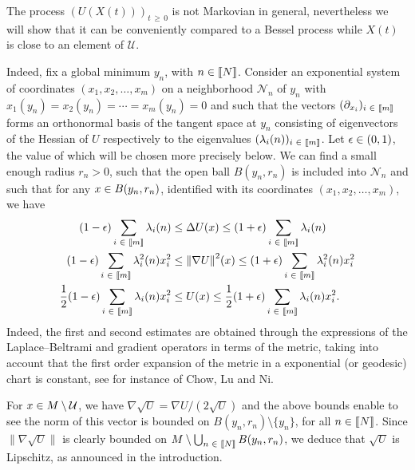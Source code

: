 \documentclass[AHL,Unicode,longabstracts,published]{cedram}
\newcommand{\f}[2]{\frac{#1}{#2}}
\newcommand{\cN}{\mathcal{N}}
\newcommand{\cU}{\mathcal{U}}
\newcommand{\na}{\nabla}
\newcommand{\pa}{\partial}
\newcommand{\tr}{\Delta}
\let\originalleft\left
\let\originalright\right
\renewcommand{\left}{\mathopen{}\mathclose\bgroup\originalleft}
\renewcommand{\right}{\aftergroup\egroup\originalright}
\let\oldin\in
\renewcommand{\in}{\mathchoice{\oldin}{\oldin}{\,\oldin\,}{\,\oldin\,}}
\newcommand{\llbracket}{\mathopen{[\mkern -2.7mu[}}
\newcommand{\rrbracket}{\mathclose{]\mkern -2.7mu]}}
\newcommand{\lin}{\llbracket}
\newcommand{\rin}{\rrbracket}
\begin{document}
The process $({U}(X(t)))_{t\,\geq\,0}$ is not Markovian in general, nevertheless we will show that it can be conveniently compared to a Bessel process while $X(t)$ is close to an element of $\cU$.


Indeed, fix a global minimum $y_n$, with $n\in\lin N\rin$. Consider an exponential system of coordinates $(x_1,x_2,\dots, x_m)$ on a neighborhood $\cN_n$ of $y_n$ with $x_1(y_n)=x_2(y_n)=\cdots =x_m(y_n)=0$ and such that the vectors $(\pa_{x_i})_{i\in\lin m\rin}$ forms an orthonormal basis of the tangent space at $y_n$ consisting of eigenvectors of the Hessian of $U$ respectively to the eigenvalues $(\lambda_i(n))_{i\in\lin m\rin}$. Let $\epsilon\in(0,1)$, the value of which will be chosen more precisely below. We can find a small enough radius $r_n>0$, such that the open ball $B(y_n,r_n)$ is included into $\cN_n$ and such that for any $x\in B(y_n,r_n)$, identified with its coordinates $(x_1,x_2,\dots, x_m)$, we have
\begin{align}
(1-\epsilon)\sum_{i\in\lin m\rin}\lambda_i(n)  &\leq \tr U(x) \leq (1+\epsilon) \sum_{i\in\lin m\rin}\lambda_i(n)
\label{app1}
\\
(1-\epsilon)\sum_{i\in\lin m\rin}\lambda_i^2(n)x_i^2  &\leq \left\|\na U\right\|^2(x) \leq (1+\epsilon) \sum_{i\in\lin m\rin}\lambda_i^2(n)x_i^2
\label{app2}
\\
\f12(1-\epsilon)\sum_{i\in\lin m\rin}\lambda_i(n)x_i^2 &\leq U(x) \leq \f12(1+\epsilon)\sum_{i\in\lin m\rin}\lambda_i(n)x_i^2.\label{app3}
\end{align}
Indeed, the first and second estimates are obtained through the expressions of the Laplace--Beltrami and gradient operators in terms of the metric, taking into account that the first order expansion of the metric in a exponential (or geodesic) chart is constant, see for instance \cite[Section~10.1, p.~58]{zbMATH05081815} of Chow, Lu and Ni.



\begin{rema} \label{Lipschitz}
For $x\in M\setminus\cU$, we have $\na\sqrt{U}=\na U/(2\sqrt{U})$ and the above bounds enable to see the norm of this vector is bounded on $B(y_n,r_n)\setminus\{y_n\}$, for all $n\in\lin N\rin$. Since $\|\na\sqrt{U}\|$ is clearly bounded on $M\setminus\bigcup_{n\in\lin N\rin} B(y_n,r_n)$, we deduce that $\sqrt{U}$ is Lipschitz, as announced in the introduction.
\end{rema}
\end{document}
